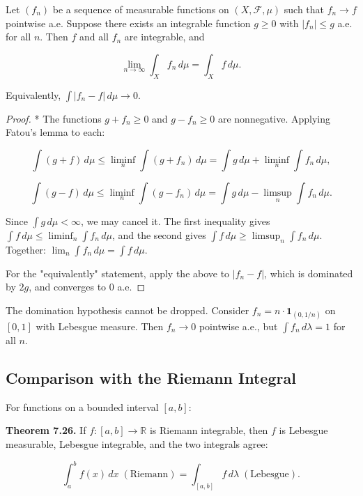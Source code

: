 \begin{theorem}\label{thm:7.24}
Let $(f_n)$ be a sequence of measurable functions on $(X, \mathcal{F}, \mu)$ such that $f_n \to f$ pointwise a.e. Suppose there exists an integrable function $g \geq 0$ with $|f_n| \leq g$ a.e. for all $n$. Then $f$ and all $f_n$ are integrable, and

\[
\lim_{n \to \infty} \int_X f_n \, d\mu = \int_X f \, d\mu.
\]

Equivalently, $\int |f_n - f| \, d\mu \to 0$.
\end{theorem}


\begin{proof}
* The functions $g + f_n \geq 0$ and $g - f_n \geq 0$ are nonnegative. Applying Fatou's lemma to each:

\[
\int (g + f) \, d\mu \leq \liminf_n \int (g + f_n) \, d\mu = \int g \, d\mu + \liminf_n \int f_n \, d\mu,
\]

\[
\int (g - f) \, d\mu \leq \liminf_n \int (g - f_n) \, d\mu = \int g \, d\mu - \limsup_n \int f_n \, d\mu.
\]

Since $\int g \, d\mu < \infty$, we may cancel it. The first inequality gives $\int f \, d\mu \leq \liminf_n \int f_n \, d\mu$, and the second gives $\int f \, d\mu \geq \limsup_n \int f_n \, d\mu$. Together: $\lim_n \int f_n \, d\mu = \int f \, d\mu$.

For the "equivalently" statement, apply the above to $|f_n - f|$, which is dominated by $2g$, and converges to $0$ a.e.
\end{proof}


\begin{remark}
The domination hypothesis cannot be dropped. Consider $f_n = n \cdot \mathbf{1}_{(0, 1/n)}$ on $[0,1]$ with Lebesgue measure. Then $f_n \to 0$ pointwise a.e., but $\int f_n \, d\lambda = 1$ for all $n$.
\end{remark}


\subsection{Comparison with the Riemann Integral}\label{sec:7.4.5}

For functions on a bounded interval $[a,b]$:

\textbf{Theorem 7.26.} If $f: [a,b] \to \mathbb{R}$ is Riemann integrable, then $f$ is Lebesgue measurable, Lebesgue integrable, and the two integrals agree:

\[
\int_a^b f(x) \, dx \;(\text{Riemann}) = \int_{[a,b]} f \, d\lambda \;(\text{Lebesgue}).
\]

